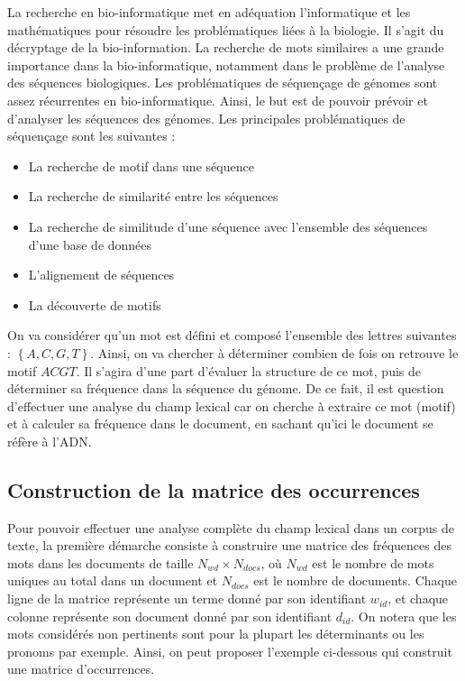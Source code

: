 \documentclass[a4paper,10pt]{article}
\begin{document}
La recherche en bio-informatique met en adéquation l’informatique
et les mathématiques pour résoudre les problématiques
liées à la biologie.
Il s’agit du décryptage de la bio-information.
La recherche de mots similaires a une grande importance dans
la bio-informatique, notamment dans le problème de l’analyse
des séquences biologiques.
Les problématiques de séquençage de génomes sont assez récurrentes
en bio-informatique.
Ainsi, le but est de pouvoir prévoir et d’analyser les
séquences des génomes.
Les principales problématiques de séquençage sont les suivantes :

\begin{itemize}
\item La recherche de motif dans une séquence
\item La recherche de similarité entre les séquences
\item La recherche de similitude d’une séquence avec l’ensemble des
séquences d’une base de données
\item L’alignement de séquences
\item La découverte de motifs
\end{itemize}

On va considérer qu’un mot est défini et composé l’ensemble des
lettres suivantes : $\left\{A, C, G, T\right\}$.
Ainsi, on va chercher à déterminer combien de fois
on retrouve le motif $A C G T$.
Il s’agira d’une part d’évaluer la structure de ce mot,
puis de déterminer sa fréquence dans la séquence du génome.
De ce fait, il est question d’effectuer une analyse du champ
lexical car on cherche à extraire ce mot (motif) et à calculer
sa fréquence dans le document, en sachant qu’ici le document se
réfère à l’ADN.

\subsection*{Construction de la matrice des occurrences}
Pour pouvoir effectuer une analyse complète du champ lexical
dans un corpus de texte, la première démarche consiste à
construire une matrice des fréquences des mots dans les documents
de taille $N_{wd}\times N_{docs}$, où $N_{wd}$ est le nombre de mots
uniques au total dans un document et $N_{docs}$
est le nombre de documents.
Chaque ligne de la matrice représente un terme
donné par son identifiant $w_{id}$,
et chaque colonne représente son document
donné par son identifiant $d_{id}$.
On notera que les mots considérés non pertinents
sont pour la plupart les déterminants ou les pronoms
par exemple.
Ainsi, on peut proposer l’exemple ci-dessous qui
construit une matrice d’occurrences.
\end{document}

